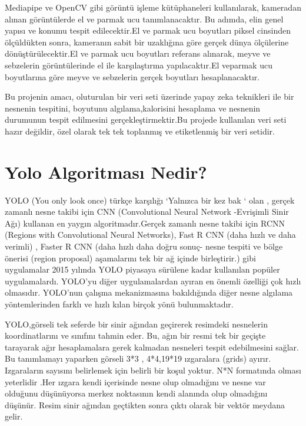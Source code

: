 \documentclass[11pt,a4paper]{report}
\begin{document}
	Mediapipe ve OpenCV gibi görüntü işleme kütüphaneleri kullanılarak, kameradan alınan görüntülerde el ve parmak ucu tanımlanacaktır. Bu adımda, elin genel yapısı ve konumu tespit edilecektir.El ve parmak ucu boyutları piksel cinsinden ölçüldükten sonra, kameranın sabit bir uzaklığına göre gerçek dünya ölçülerine dönüştürülecektir.El ve parmak ucu boyutları referans alınarak, meyve ve sebzelerin görüntülerinde el ile karşılaştırma yapılacaktır.El veparmak ucu boyutlarına göre meyve ve sebzelerin gerçek boyutları hesaplanacaktır.
	\newline
	
	Bu projenin amacı, oluturulan bir veri seti üzerinde yapay zeka teknikleri ile bir nesnenin tespitini, boyutunu algılama,kalorisini hesaplama ve nesnenin durumunun tespit edilmesini gerçekleştirmektir.Bu projede kullanılan veri seti hazır değildir, özel olarak tek tek toplanmış ve etiketlenmiş bir veri setidir.


     
     \section{Yolo Algoritması Nedir?}
    YOLO (You only look once) türkçe karşılığı ‘Yalnızca bir kez bak ‘ olan , gerçek zamanlı nesne takibi için CNN (Convolutional Neural Network -Evrişimli Sinir Ağı) kullanan en yaygın algoritmadır.Gerçek zamanlı nesne takibi için RCNN (Regions with Convolutional Neural Networks), Fast R CNN (daha hızlı ve daha verimli) , Faster R CNN (daha hızlı daha doğru sonuç- nesne tespiti ve bölge önerisi (region proposal) aşamalarını tek bir ağ içinde birleştirir.) gibi uygulamalar 2015 yılında YOLO piyasaya sürülene kadar kullanılan popüler uygulamalardı. YOLO’yu diğer uygulamalardan ayıran en önemli özelliği çok hızlı olmasıdır. YOLO’nun çalışma mekanizmasına bakıldığında diğer nesne algılama yöntemlerinden farklı ve hızlı kılan birçok yönü bulunmaktadır. 
    \newline
    
    YOLO,görseli tek seferde bir sinir ağından geçirerek resimdeki nesnelerin koordinatlarını ve sınıfını tahmin eder. Bu, ağın bir resmi tek bir geçişte tarayarak ağır hesaplamalara gerek kalmadan nesneleri tespit edebilmesini sağlar. Bu tanımlamayı yaparken görseli 3*3 , 4*4,19*19 ızgaralara (grids) ayırır. Izgaraların sayısını belirlemek için belirli bir koşul yoktur. N*N formatında olması yeterlidir .Her ızgara kendi içerisinde nesne olup olmadığını ve nesne var olduğunu düşünüyorsa merkez noktasının kendi alanında olup olmadığını düşünür. Resim sinir ağından geçtikten sonra çıktı olarak bir vektör meydana gelir.\cite{mediumcom}
    
\end{document}

